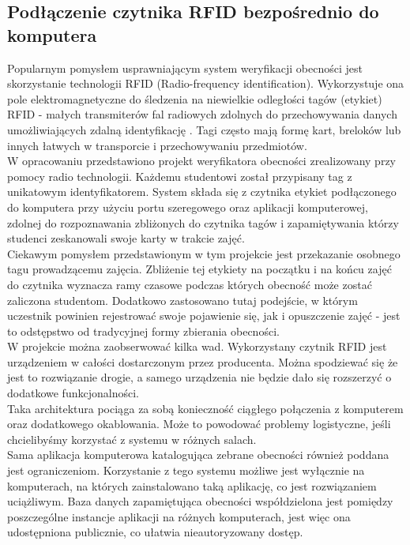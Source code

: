 \documentclass[declaration,shortabstract, mgr]{iithesis}
\begin{document}
\subsection{Podłączenie czytnika RFID bezpośrednio do komputera}
\indent Popularnym pomysłem usprawniającym system weryfikacji obecności jest skorzystanie technologii RFID (Radio-frequency identification). Wykorzystuje ona pole elektromagnetyczne do śledzenia na niewielkie odległości tagów (etykiet) RFID - małych transmiterów fal radiowych zdolnych do przechowywania danych umożliwiających zdalną identyfikację \cite{rfid_itself}. Tagi często mają formę kart, breloków lub innych łatwych w transporcie i przechowywaniu przedmiotów.\\
\indent W opracowaniu \cite{rfid_serial} przedstawiono projekt weryfikatora obecności zrealizowany przy pomocy radio technologii. Każdemu studentowi został przypisany tag z unikatowym identyfikatorem. System składa się z czytnika etykiet podłączonego do komputera przy użyciu portu szeregowego oraz aplikacji komputerowej, zdolnej do rozpoznawania zbliżonych do czytnika tagów i zapamiętywania którzy studenci zeskanowali swoje karty w trakcie zajęć. \\
\indent Ciekawym pomysłem przedstawionym w tym projekcie jest przekazanie osobnego tagu prowadzącemu zajęcia. Zbliżenie tej etykiety na początku i na końcu zajęć do czytnika wyznacza ramy czasowe podczas których obecność może zostać zaliczona studentom. Dodatkowo zastosowano tutaj podejście, w którym uczestnik powinien rejestrować swoje pojawienie się, jak i opuszczenie zajęć - jest to odstępstwo od tradycyjnej formy zbierania obecności. \\
\indent W projekcie można zaobserwować kilka wad. Wykorzystany czytnik RFID jest urządzeniem w całości dostarczonym przez producenta. Można spodziewać się że jest to rozwiązanie drogie, a samego urządzenia nie będzie dało się rozszerzyć o dodatkowe funkcjonalności. \\
\indent Taka architektura pociąga za sobą konieczność ciągłego połączenia z komputerem oraz dodatkowego okablowania. Może to powodować problemy logistyczne, jeśli chcielibyśmy korzystać z systemu w różnych salach.\\
\indent Sama aplikacja komputerowa katalogująca zebrane obecności również poddana jest ograniczeniom. Korzystanie z tego systemu możliwe jest wyłącznie na komputerach, na których zainstalowano taką aplikację, co jest rozwiązaniem uciążliwym. Baza danych zapamiętująca obecności współdzielona jest pomiędzy poszczególne instancje aplikacji na różnych komputerach, jest więc ona udostępniona publicznie, co ułatwia nieautoryzowany dostęp.
\end{document}
